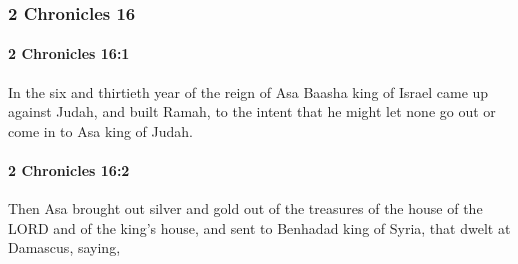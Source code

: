 	\subsubsection{2 Chronicles 16} %
		\label{2CHRONICLES-16}

		\paragraph{2 Chronicles 16:1} %
			\label{2CHRONICLES-16-1}

			In the six and thirtieth year of the reign of Asa Baasha king of Israel came up against Judah, and built Ramah, to the intent that he might let none go out or come in to Asa king of Judah.


		\paragraph{2 Chronicles 16:2} %
			\label{2CHRONICLES-16-2}

			Then Asa brought out silver and gold out of the treasures of the house of the LORD and of the king's house, and sent to Benhadad king of Syria, that dwelt at Damascus, saying,

